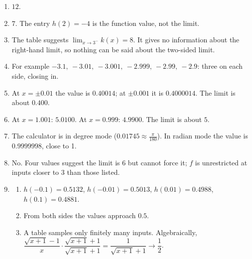 \documentclass[11pt]{article}
\begin{document}
\newpage
\begin{solbox}
\begin{enumerate}[leftmargin=*,itemsep=4pt]
  \item $12$.
  \item $7$. The entry $h(2)=-4$ is the function value, not the limit.
  \item The table suggests $\displaystyle\lim_{x\to 3^-}k(x)=8$. It gives no information about the right-hand limit, so nothing can be said about the two-sided limit.
  \item For example $-3.1,\ -3.01,\ -3.001,\ -2.999,\ -2.99,\ -2.9$: three on each side, closing in.
  \item At $x=\pm0.01$ the value is $0.40014$; at $\pm0.001$ it is $0.4000014$. The limit is about $0.400$.
  \item At $x=1.001$: $5.0100$. At $x=0.999$: $4.9900$. The limit is about $5$.
  \item The calculator is in degree mode ($0.01745\approx\tfrac{\pi}{180}$). In radian mode the value is $0.9999998$, close to 1.
  \item No. Four values suggest the limit is 6 but cannot force it; $f$ is unrestricted at inputs closer to 3 than those listed.
  \item \begin{enumerate}[label=(\alph*),leftmargin=*,itemsep=3pt]
    \item $h(-0.1)=0.5132$, $h(-0.01)=0.5013$, $h(0.01)=0.4988$, $h(0.1)=0.4881$.
    \item From both sides the values approach $0.5$.
    \item A table samples only finitely many inputs. Algebraically, $\dfrac{\sqrt{x+1}-1}{x}\cdot\dfrac{\sqrt{x+1}+1}{\sqrt{x+1}+1}=\dfrac{1}{\sqrt{x+1}+1}\to\dfrac12$.
  \end{enumerate}
\end{enumerate}
\end{solbox}
\end{document}
